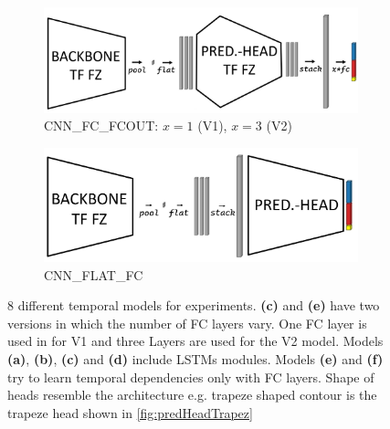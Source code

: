 \begin{figure}[H]
    \vspace{0.5cm} %

    \begin{subfigure}[b]{0.48\textwidth}
        \centering
        \includegraphics[width=\textwidth]{PICs/temporalModels/CNN_FC_FCOUT_V1_V2.jpg}
        \caption{CNN\_FC\_FCOUT: $x=1$ (V1), $x=3$ (V2)}
    \end{subfigure}
    \hfill
    \begin{subfigure}[b]{0.48\textwidth}
        \centering
        \includegraphics[width=\textwidth]{PICs/temporalModels/CNN_FLAT_FC.jpg}
        \caption{CNN\_FLAT\_FC}
    \end{subfigure}
    \caption{8 different temporal models for experiments. \textbf{(c)} and \textbf{(e)} have two versions in which the number of \ac{FC} layers vary. One \ac{FC} layer is used in for V1 and three Layers are used for the V2 model. Models \textbf{(a)}, \textbf{(b)}, \textbf{(c)} and \textbf{(d)} include LSTMs modules. Models \textbf{(e)} and \textbf{(f)} try to learn temporal dependencies only with \ac{FC} layers. Shape of heads resemble the architecture e.g. trapeze shaped contour is the trapeze head shown in \autoref{fig:predHeadTrapez}}
    \label{fig:temporalModels}
\end{figure}


